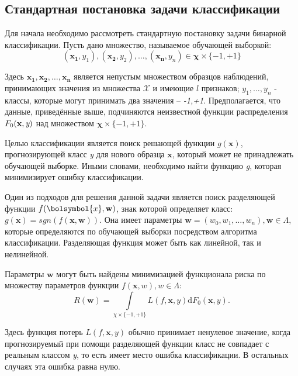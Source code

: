 \documentclass[12pt,a4paper,oneside]{article}
\begin{document}
\begin{multicols}{2}

\vspace*{1em}
\chapter{Стандартная постановка задачи классификации}

\par
Для начала необходимо рассмотреть стандартную постановку задачи бинарной классификации.
Пусть дано множество, называемое обучающей выборкой:
\[
(\mathbf{x_1}, y_1),(\mathbf{x_2}, y_2), \dots, (\mathbf{x_n}, y_n) \in \mathbf{\chi} \times \{-1,+1\}
\]

\par
Здесь \(\mathbf{x_1}, \mathbf{x_2}, \dots, \mathbf{x_n}\) является непустым множеством образцов наблюдений, принимающих значения из множества \(\mathcal{X}\) и имеющие $l$ признаков; \(y_1, \dots, y_n\) - классы, которые могут принимать два значения -- \emph{-1,+1}. 
Предполагается, что данные, приведённые выше, подчиняются неизвестной функции распределения \(F_0(\mathbf{x}, \emph{y})\) над множеством \(\mathbf{\chi} \times \{-1, +1\}\). 

\par
Целью классификации является поиск решающей функции \(g(\mathbf{x})\), прогнозирующей класс \emph{y} для нового образца \(\mathbf{x}\), который может не принадлежать обучающей выборке. 
Иными словами, необходимо найти функцию \emph{g}, которая минимизирует ошибку классификации. 

\par
Один из подходов для решения данной задачи является поиск разделяющей функции \(f(\bolsymbol{x}, \mathbf{w})\), знак которой определяет класс: \(g(\mathbf{x})=sgn(f(\mathbf{x}, \mathbf{w}))\).
Она имеет параметры \(\mathbf{w}=(w_0, w_1, \dots, w_n), \mathbf{w} \in \Lambda\), которые определяются по обучающей выборки посредством алгоритма классификации. 
Разделяющая функция может быть как линейной, так и нелинейной.

\par
Параметры \(\mathbf{w}\) могут быть найдены минимизацией функционала риска по множеству параметров функции \(f(\mathbf{x}, w), w \in \Lambda\):
\[
R(\mathbf{w}) = \int \limits_{\chi \times \{-1, +1\}} L(f, \mathbf{x}, y) \mathrm{d} F_0(\mathbf{x}, y).
\]

\par
Здесь функция потерь \(L(f, \mathbf{x}, y)\) обычно принимает ненулевое значение, когда прогнозируемый при помощи разделяющей функции класс не совпадает с реальным классом \emph{y}, то есть имеет место ошибка классификации. 
В остальных случаях эта ошибка равна нулю. 


\end{multicols}
\end{document}
